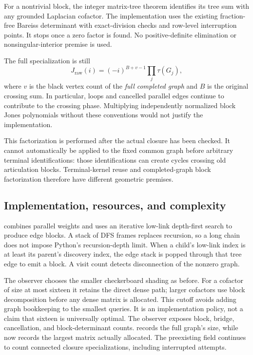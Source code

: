 For a nontrivial block, the integer matrix-tree theorem identifies its tree
sum with any grounded Laplacian cofactor.  The implementation uses the
existing fraction-free Bareiss determinant with exact-division checks and
row-level interruption points.  It stops once a zero factor is found.
No positive-definite elimination or nonsingular-interior premise is used.

The full specialization is still
\[
 J_{\mathrm{raw}}(i)=(-i)^{B+v-1}\prod_j\tau(G_j),
\]
where $v$ is the black vertex count of the \emph{full completed graph} and
$B$ is the original crossing sum.  In particular, loops and cancelled
parallel edges continue to contribute to the crossing phase.  Multiplying
independently normalized block Jones polynomials without these conventions
would not justify the implementation.

This factorization is performed after the actual closure has been checked.
It cannot automatically be applied to the fixed common graph before arbitrary
terminal identifications: those identifications can create cycles crossing
old articulation blocks.  Terminal-kernel reuse and completed-graph block
factorization therefore have different geometric premises.

\subsection{Implementation, resources, and complexity}

 combines parallel weights and uses an
iterative low-link depth-first search to produce edge blocks.  A stack of
DFS frames replaces recursion, so a long chain does not impose Python's
recursion-depth limit.  When a child's low-link index is at least its
parent's discovery index, the edge stack is popped through that tree edge
to emit a block.  A visit count detects disconnection of the nonzero graph.

The observer chooses the smaller checkerboard shading as before.  For a
cofactor of size at most sixteen it retains the direct dense path; larger
cofactors use block decomposition before any dense matrix is allocated.
This cutoff avoids adding graph bookkeeping to the smallest queries.  It
is an implementation policy, not a claim that sixteen is universally optimal.
The observer exposes block, bridge, cancellation, and block-determinant
counts.   records the full graph's size,
while  now records the largest matrix actually
allocated.  The preexisting  field continues to count
connected closure specializations, including interrupted attempts.

